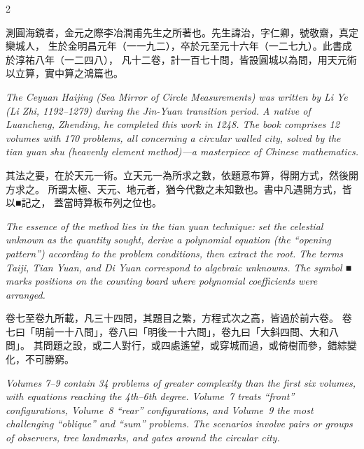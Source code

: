 \documentclass[11pt,a4paper]{article}
\newcommand{\cnpar}[1]{{\tradfont #1\par}}
\newcommand{\enpar}[1]{{\itshape #1\par}}
\begin{document}
\begin{paracol}{2}

\cnpar{%
測圓海鏡者，金元之際李冶潤甫先生之所著也。先生諱治，字仁卿，號敬齋，真定欒城人，
生於金明昌元年（一一九二），卒於元至元十六年（一二七九）。此書成於淳祐八年（一二四八），
凡十二卷，計一百七十問，皆設圓城以為問，用天元術以立算，實中算之鴻篇也。}

\switchcolumn

\enpar{%
The \textit{Ceyuan Haijing} (Sea Mirror of Circle Measurements) was written by Li Ye (Li Zhi, 
1192--1279) during the Jin-Yuan transition period. A native of Luancheng, Zhending, he completed
this work in 1248. The book comprises 12 volumes with 170 problems, all concerning a circular
walled city, solved by the \textit{tian yuan shu} (heavenly element method)---a masterpiece of
Chinese mathematics.}

\switchcolumn*

\cnpar{%
其法之要，在於天元一術。立天元一為所求之數，依題意布算，得開方式，然後開方求之。
所謂太極、天元、地元者，猶今代數之未知數也。書中凡遇開方式，皆以■記之，
蓋當時算板布列之位也。}

\switchcolumn

\enpar{%
The essence of the method lies in the \textit{tian yuan} technique: set the celestial unknown
as the quantity sought, derive a polynomial equation (the ``opening pattern'') according to the
problem conditions, then extract the root. The terms Taiji, Tian Yuan, and Di Yuan correspond to
algebraic unknowns. The symbol ■ marks positions on the counting board where polynomial
coefficients were arranged.}

\switchcolumn*

\cnpar{%
卷七至卷九所載，凡三十四問，其題目之繁，方程式次之高，皆過於前六卷。
卷七曰「明前一十八問」，卷八曰「明後一十六問」，卷九曰「大斜四問、大和八問」。
其問題之設，或二人對行，或四處遙望，或穿城而過，或倚樹而參，錯綜變化，不可勝窮。}

\switchcolumn

\enpar{%
Volumes 7--9 contain 34 problems of greater complexity than the first six volumes, with
equations reaching the 4th--6th degree. Volume~7 treats ``front'' configurations, Volume~8
``rear'' configurations, and Volume~9 the most challenging ``oblique'' and ``sum'' problems.
The scenarios involve pairs or groups of observers, tree landmarks, and gates around the
circular city.}

\end{paracol}
\end{document}
